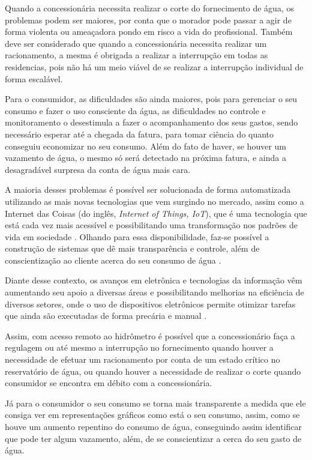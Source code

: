 \documentclass[
	article,			%
	11pt,				%
	oneside,			%
	a4paper,			%
	english,			%
	brazil,				%
	sumario=tradicional,
	doublespacing
	]{abntex2}
\begin{document}
\begin{DoubleSpace}
    Quando a concessionária necessita realizar o corte do fornecimento de água, os problemas podem ser maiores, por conta que o morador pode passar a agir de forma violenta ou ameaçadora pondo em risco a vida do profissional. Também deve ser considerado que quando a concessionária necessita realizar um racionamento, a mesma é obrigada a realizar a interrupção em todas as residencias, pois não há um meio viável de se realizar a interrupção individual de forma escalável.
    
    Para o consumidor, as dificuldades são ainda maiores, pois para gerenciar o seu consumo e fazer o uso consciente da água, as dificuldades no controle e monitoramento o desestimula a fazer o acompanhamento dos seus gastos, sendo necessário esperar até a chegada da fatura, para tomar ciência do quanto conseguiu economizar no seu consumo. Além do fato de haver, se houver um vazamento de água, o mesmo só será detectado na próxima fatura, e ainda a desagradável surpresa da conta de água mais cara.
    
    A maioria desses problemas é possível ser solucionada de forma automatizada utilizando as mais novas tecnologias que vem surgindo no mercado, assim como a Internet das Coisas (do inglês, \textit{Internet of Things, IoT}), que é uma tecnologia que está cada vez mais acessível e possibilitando uma transformação nos padrões de vida em sociedade \cite{martins2017gerenciamento}. 
    Olhando para essa disponibilidade, faz-se possível a construção de sistemas que dê mais transparência e controle, além de conscientização ao cliente acerca do seu consumo de água \cite{decidades}.
   
    Diante desse contexto, os avanços em eletrônica e tecnologias da informação vêm aumentando seu apoio a diversas áreas e possibilitando melhorias na eficiência de diversos setores, onde o uso de dispositivos eletrônicos permite otimizar tarefas que ainda são executadas de forma precária e manual \cite{biegelmeyer2017desenvolvimento}.
    
    Assim, com acesso remoto ao hidrômetro é possível que a concessionário faça a regulagem ou até mesmo a interrupção no fornecimento quando houver a necessidade de efetuar um racionamento por conta de um estado crítico no reservatório de água, ou quando houver a necessidade de realizar o corte quando consumidor se encontra em débito com a concessionária. 
    
    Já para o consumidor o seu consumo se torna mais transparente a medida que ele consiga ver em representações gráficos como está o seu consumo, assim, como se houve um aumento repentino do consumo de água, conseguindo assim identificar que pode ter algum vazamento, além, de se conscientizar a cerca do seu gasto de água.
    

\end{DoubleSpace}
\end{document}
